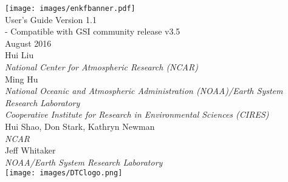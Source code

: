 \begin{titlepage}
\vspace*{2.0cm}
\noindent
{}
   \begin{center}
      \texttt{[image: images/enkfbanner.pdf]}~\\[2em]
     {\color{darkcerulean}
         \Huge{User's Guide Version 1.1}\\[1em]
         \large{- Compatible with GSI community release v3.5}\\[2em]
         \normalsize{August 2016}\\[5em]
      } 
      \normalsize{Hui Liu}\\
      \textit{\small{National Center for Atmospheric Research (NCAR)}}\\[2em]
      \normalsize{Ming Hu}\\ 
      \textit{\small{National Oceanic and Atmospheric Administration (NOAA)/Earth System Research Laboratory}}\\
      \textit{\small{Cooperative Institute for Research in Environmental Sciences (CIRES)}}\\[2em]
      \normalsize{Hui Shao, Don Stark, Kathryn Newman}\\
      \textit{\small{NCAR}}\\[2em]
      \normalsize{Jeff Whitaker}\\ 
      \textit{\small{NOAA/Earth System Research Laboratory}}\\[4em]

       \texttt{[image: images/DTClogo.png]}\\
  
       \vspace{1em}

   \end{center}
\end{titlepage}
\pagebreak{}





